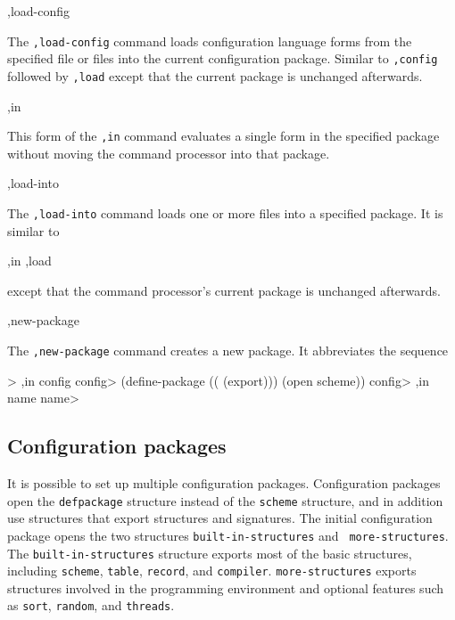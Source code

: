 \begin{list}{}{}{}
\item
\begin{code}
,load-config  \etc
\end{code}
    The {\tt,load-config} command loads configuration language forms from
    the specified file or files into the current configuration package.
    Similar to {\tt,config} followed by {\tt,load} except that the current
    package is unchanged afterwards.

\item
\begin{code}
,in  
\end{code}
    This form of the {\tt,in} command evaluates a single form in the
    specified package without moving the command processor into that
    package. 

\item
\begin{code}
,load-into   \etc
\end{code}
    The {\tt,load-into} command loads one or more files into a specified
    package.  It is similar to
\begin{code}
    ,in 
    ,load  \etc
\end{code}
    except that the command processor's current package is unchanged
    afterwards.

\item
\begin{code}
,new-package   \etc
\end{code}
    The {\tt,new-package} command creates a new package.  It
    abbreviates the sequence 
\begin{code}
    > ,in config
    config> (define-package (( (export)))
	      (open  \etc{} scheme))
    config> ,in name
    name> 
\end{code}

\end{list}



\subsection*{Configuration packages}

It is possible to set up multiple configuration packages.
Configuration packages open the {\tt defpackage} structure instead of
the {\tt scheme} structure, and in addition use structures that export
structures and signatures.  The initial configuration package opens
the two structures {\tt built-in-structures} and {\tt
more-structures}.  The {\tt built-in-structures} structure exports
most of the basic structures, including {\tt scheme}, {\tt table},
{\tt record}, and {\tt compiler}.  {\tt more-structures} exports
structures involved in the programming environment and optional
features such as {\tt sort}, {\tt random}, and {\tt threads}.

